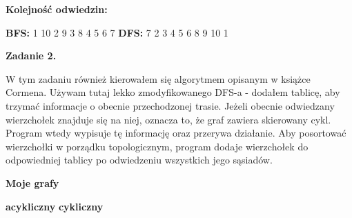 \documentclass[15pt, a4paper]{article}
\begin{document}
\vspace{0.5cm} 

\begin{center}
    \textbf{Kolejność odwiedzin:}
\end{center}

\vspace{0.3cm} 

\noindent
\textbf{BFS:} 1 10 2 9 3 8 4 5 6 7  \hfill \textbf{DFS:} 7 2 3 4 5 6 8 9 10 1  

\vspace{1.5cm}


\vspace{0.5cm}

\noindent\hrulefill

\vspace{0.5cm}

\noindent\textbf{Zadanie 2.} 

\noindent W tym zadaniu również kierowałem się algorytmem opisanym w książce Cormena. Używam tutaj lekko zmodyfikowanego DFS-a - dodałem tablicę, aby trzymać informacje o obecnie przechodzonej trasie. Jeżeli obecnie odwiedzany wierzchołek znajduje się na niej, oznacza to, że graf zawiera skierowany cykl. Program wtedy wypisuje tę informację oraz przerywa działanie. Aby posortować wierzchołki w porządku topologicznym, program dodaje wierzchołek do odpowiedniej tablicy po odwiedzeniu wszystkich jego sąsiadów.

\vspace{0.5cm}

\begin{center}
    \textbf{Moje grafy}
\end{center}

\begin{center}
    \textbf{acykliczny} \hspace{4cm} \textbf{cykliczny}
\end{center}
\end{document}

